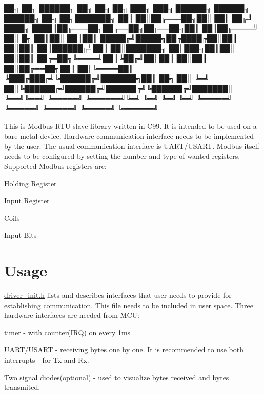 
\begin{DoxyCode}
██╗    ██╗ ██████╗ ██╗     ██╗  ██╗     ███╗   ███╗ ██████╗ ██████╗ ██████╗ ██╗   ██╗███████╗
██║    ██║██╔═══██╗██║     ██║ ██╔╝     ████╗ ████║██╔═══██╗██╔══██╗██╔══██╗██║   ██║██╔════╝
██║ █╗ ██║██║   ██║██║     █████╔╝█████╗██╔████╔██║██║   ██║██║  ██║██████╔╝██║   ██║███████╗
██║███╗██║██║   ██║██║     ██╔═██╗╚════╝██║╚██╔╝██║██║   ██║██║  ██║██╔══██╗██║   ██║╚════██║
╚███╔███╔╝╚██████╔╝███████╗██║  ██╗     ██║ ╚═╝ ██║╚██████╔╝██████╔╝██████╔╝╚██████╔╝███████║
 ╚══╝╚══╝  ╚═════╝ ╚══════╝╚═╝  ╚═╝     ╚═╝     ╚═╝ ╚═════╝ ╚═════╝ ╚═════╝  ╚═════╝ ╚══════╝
\end{DoxyCode}


This is Modbus R\+TU slave library written in C99. It is intended to be used on a bare-\/metal device. Hardware communication interface needs to be implemented by the user. The usual communication interface is U\+A\+R\+T/\+U\+S\+A\+RT. Modbus itself needs to be configured by setting the number and type of wanted registers. Supported Modbus registers are\+:
\begin{DoxyItemize}
\item Holding Register
\item Input Register
\item Coils
\item Input Bits
\end{DoxyItemize}

\section*{Usage}

{\ttfamily \mbox{\hyperlink{driver__init_8h}{driver\+\_\+init.\+h}}} lists and describes interfaces that user needs to provide for establishing communication. This file needs to be included in user space. Three hardware interfaces are needed from M\+CU\+:
\begin{DoxyItemize}
\item timer -\/ with counter(\+I\+R\+Q) on every 1ms
\item U\+A\+R\+T/\+U\+S\+A\+RT -\/ receiving bytes one by one. It is recommended to use both interrupts -\/ for Tx and Rx.
\item Two signal diodes(optional) -\/ used to visualize bytes received and bytes transmited.
\end{DoxyItemize}

